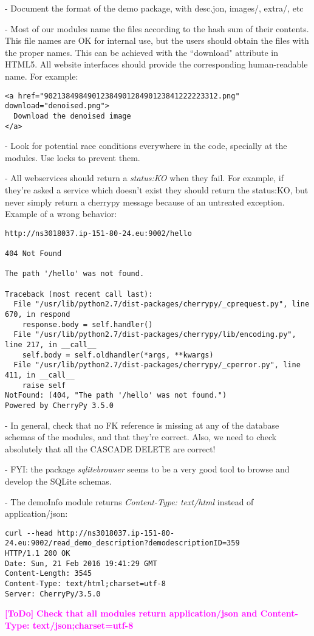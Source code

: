 \documentclass[a4paper,12pt]{article}
\newcommand{\ToDo}[1]{\textcolor{magenta}{\textbf{[ToDo]} \textbf{#1}}}
\begin{document}
- Document the format of the demo package, with desc.jon, images/, extra/, etc

- Most of our modules name the files according to the hash sum of their contents. This file names are OK for internal use, but the users should obtain the files with the proper names. This can be achieved with the ``download" attribute in HTML5. All website interfaces should provide the corresponding human-readable name. For example:

\begin{verbatim}
<a href="9021384984901238490128490123841222223312.png" download="denoised.png">
  Download the denoised image
</a>
\end{verbatim}

- Look for potential race conditions everywhere in the code, specially at the modules. Use locks to prevent them.

- All webservices should return a \emph{status:KO} when they fail. For example, if they're asked a service which doesn't exist they should return the status:KO, but never simply return a cherrypy message because of an untreated exception. Example of a wrong behavior:

\begin{verbatim}
http://ns3018037.ip-151-80-24.eu:9002/hello

404 Not Found

The path '/hello' was not found.

Traceback (most recent call last):
  File "/usr/lib/python2.7/dist-packages/cherrypy/_cprequest.py", line 670, in respond
    response.body = self.handler()
  File "/usr/lib/python2.7/dist-packages/cherrypy/lib/encoding.py", line 217, in __call__
    self.body = self.oldhandler(*args, **kwargs)
  File "/usr/lib/python2.7/dist-packages/cherrypy/_cperror.py", line 411, in __call__
    raise self
NotFound: (404, "The path '/hello' was not found.")
Powered by CherryPy 3.5.0
\end{verbatim}

- In general, check that no FK reference is missing at any of the database schemas of the modules, and that they're correct.
Also, we need to check absolutely that all the CASCADE DELETE are correct!

- FYI: the package \emph{sqlitebrowser} seems to be a very good tool to browse and develop the SQLite schemas.

- The demoInfo module returns \emph{Content-Type: text/html} instead of application/json:

\begin{verbatim}
curl --head http://ns3018037.ip-151-80-24.eu:9002/read_demo_description?demodescriptionID=359
HTTP/1.1 200 OK
Date: Sun, 21 Feb 2016 19:41:29 GMT
Content-Length: 3545
Content-Type: text/html;charset=utf-8
Server: CherryPy/3.5.0
\end{verbatim}
\ToDo{Check that all modules return application/json and Content-Type: text/json;charset=utf-8}
\end{document}
